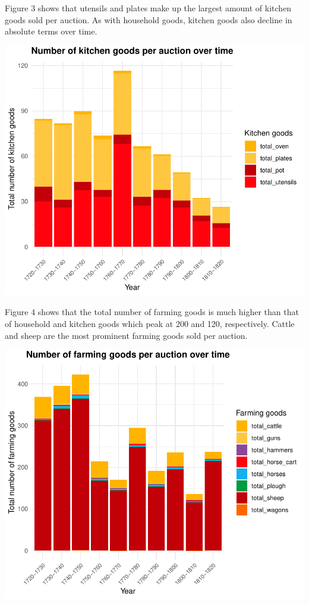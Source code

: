 \documentclass[11pt,preprint, authoryear]{elsarticle}
\numberwithin{equation}{section}
\numberwithin{figure}{section}
\numberwithin{table}{section}
\begin{document}
Figure 3 shows that utensils and plates make up the largest amount of
kitchen goods sold per auction. As with household goods, kitchen goods
also decline in absolute terms over time.

\includegraphics{Project_write_up_files/figure-latex/Figure3-1.pdf}

Figure 4 shows that the total number of farming goods is much higher
than that of household and kitchen goods which peak at 200 and 120,
respectively. Cattle and sheep are the most prominent farming goods sold
per auction.

\includegraphics{Project_write_up_files/figure-latex/Figure4-1.pdf}
\end{document}
